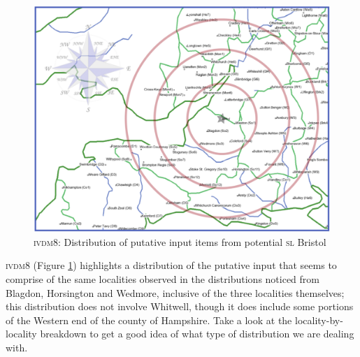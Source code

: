 \begin{figure}
\includegraphics[width=\textwidth] {figures/ivdm8.pdf}
\addtocounter{figure}{-1}\renewcommand{\thefigure}{\arabic{figure}.14}
\caption {\textsc{ivdm8}: Distribution of putative input items from potential \textsc{sl} Bristol} 
\label{Map5.14}
\end{figure}

\textsc{ivdm8} (Figure \ref{Map5.14}) highlights a distribution of the putative input that seems to comprise of the same localities observed in the distributions noticed from Blagdon, Horsington and Wedmore, inclusive of the three localities themselves; this distribution does not involve Whitwell, though it does include some portions of the Western end of the county of Hampshire. Take a look at the locality-by-locality breakdown to get a good idea of what type of distribution we are dealing with.

